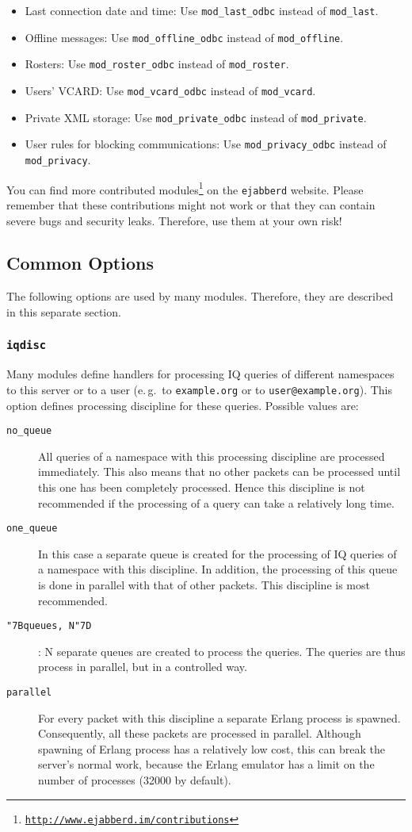 \documentclass[a4paper,10pt]{book}
\newcommand{\ind}[1]{\begin{latexonly}\index{#1}\end{latexonly}}
\newcommand{\bracehack}{\def\{{\char"7B}\def\}{\char"7D}}
\newcommand{\titem}[1]{\item[\bracehack\texttt{#1}]}
\newcommand{\jid}[1]{\texttt{#1}}
\newcommand{\option}[1]{\texttt{#1}}
\newcommand{\term}[1]{\texttt{#1}}
\newcommand{\ejabberd}{\texttt{ejabberd}}
\gdef\footahref#1#2{#2\footnote{\href{#1}{\texttt{#1}}}}
\begin{document}
\begin{itemize}
\item Last connection date and time: Use \term{mod\_last\_odbc} instead of
  \term{mod\_last}.
\item Offline messages: Use \term{mod\_offline\_odbc} instead of
  \term{mod\_offline}.
\item Rosters: Use \term{mod\_roster\_odbc} instead of \term{mod\_roster}.
\item Users' VCARD: Use \term{mod\_vcard\_odbc} instead of \term{mod\_vcard}.
\item Private XML storage: Use \term{mod\_private\_odbc} instead of \term{mod\_private}.
\item User rules for blocking communications: Use \term{mod\_privacy\_odbc} instead of \term{mod\_privacy}.
\end{itemize}

You can find more
\footahref{http://www.ejabberd.im/contributions}{contributed modules} on the
\ejabberd{} website. Please remember that these contributions might not work or
that they can contain severe bugs and security leaks. Therefore, use them at
your own risk!


\subsection{Common Options}
\label{modcommonoptions}

The following options are used by many modules. Therefore, they are described in
this separate section.

\subsubsection{\option{iqdisc}}
\label{modiqdiscoption}
\ind{options!iqdisc}

Many modules define handlers for processing IQ queries of different namespaces
to this server or to a user (e.\,g.\ to \jid{example.org} or to
\jid{user@example.org}). This option defines processing discipline for
these queries. Possible values are:
\begin{description}
\titem{no\_queue} All queries of a namespace with this processing discipline are
  processed immediately. This also means that no other packets can be processed
  until this one has been completely processed. Hence this discipline is not
  recommended if the processing of a query can take a relatively long time.
\titem{one\_queue} In this case a separate queue is created for the processing
  of IQ queries of a namespace with this discipline. In addition, the processing
  of this queue is done in parallel with that of other packets. This discipline
  is most recommended.
  \titem{\{queues, N\}}: N separate queues are created to process the
  queries. The queries are thus process in parallel, but in a
  controlled way.
\titem{parallel} For every packet with this discipline a separate Erlang process
  is spawned. Consequently, all these packets are processed in parallel.
  Although spawning of Erlang process has a relatively low cost, this can break
  the server's normal work, because the Erlang emulator has a limit on the
  number of processes (32000 by default).
\end{description}
\end{document}
